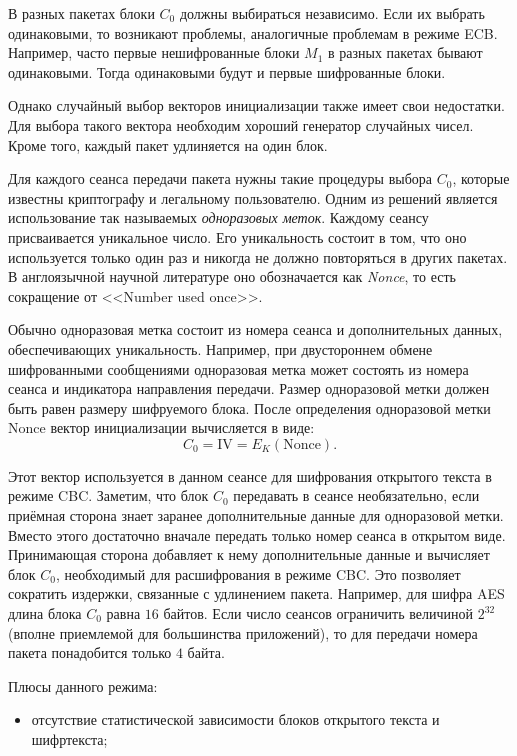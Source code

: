 В разных пакетах блоки $C_0$ должны выбираться независимо. Если их выбрать одинаковыми, то возникают проблемы, аналогичные проблемам в режиме ECB. Например, часто первые нешифрованные блоки $M_1$ в разных пакетах бывают одинаковыми. Тогда одинаковыми будут и первые шифрованные блоки.

Однако случайный выбор векторов инициализации также имеет свои недостатки. Для выбора такого вектора необходим хороший генератор случайных чисел. Кроме того, каждый пакет удлиняется на один блок.

Для каждого сеанса передачи пакета нужны такие процедуры выбора $C_0$, которые известны криптографу и легальному пользователю. Одним из решений является использование так называемых \emph{одноразовых меток}. Каждому сеансу присваивается уникальное число. Его уникальность состоит в том, что оно используется только один раз и никогда не должно повторяться в других пакетах. В англоязычной научной литературе оно обозначается как \emph{Nonce}, то есть сокращение от <<Number used once>>.

Обычно одноразовая метка состоит из номера сеанса и дополнительных данных, обеспечивающих уникальность. Например, при двустороннем обмене шифрованными сообщениями одноразовая метка может состоять из номера сеанса и индикатора направления передачи. Размер одноразовой метки должен быть равен размеру шифруемого блока. После определения одноразовой метки $\textrm{Nonce}$ вектор инициализации вычисляется в виде:
    \[ C_0 = \textrm{IV} = E_K(\textrm{Nonce}). \]

Этот вектор используется в данном сеансе для шифрования открытого текста в режиме CBC. Заметим, что блок $C_0$ передавать в сеансе необязательно, если приёмная сторона знает заранее дополнительные данные для одноразовой метки. Вместо этого достаточно вначале передать только номер сеанса в открытом виде. Принимающая сторона добавляет к нему дополнительные данные и вычисляет блок $C_0$, необходимый для расшифрования в режиме CBC. Это позволяет сократить издержки, связанные с удлинением пакета. Например, для шифра AES длина блока $C_0$ равна $16$ байтов. Если число сеансов ограничить величиной $2^{32}$ (вполне приемлемой для большинства приложений), то для передачи номера пакета понадобится только $4$ байта.

Плюсы данного режима:
\begin{itemize}
	\item отсутствие статистической зависимости блоков открытого текста и шифртекста;
\end{itemize}

